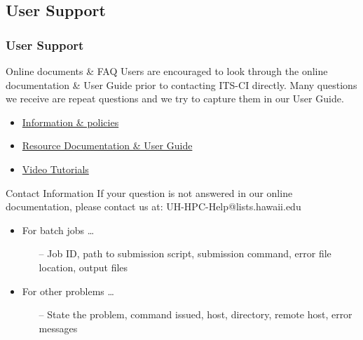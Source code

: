

\subsection{User Support}
\begin{frame}
  \frametitle{User Support}

  \begin{block}{Online documents \& FAQ}
    Users are encouraged to look through the online documentation \& User Guide prior to contacting ITS-CI directly.  Many questions we receive are repeat questions and we try to capture them in our User Guide.~\\
		\begin{itemize}
		\item \href{http://datascience.hawaii.edu/hpc/}{Information \& policies}
		\item \href{http://go.hawaii.edu/ex2}{Resource Documentation \& User Guide}
		\item \href{http://go.hawaii.edu/3A8}{Video Tutorials}
		\end{itemize}
  \end{block}
  \begin{block}{Contact Information}
    If your question is not answered in our online documentation, please contact us at: UH-HPC-Help@lists.hawaii.edu
    
    \begin{itemize}
    \item For batch jobs \ldots
      \begin{itemize}
      \item[--] Job ID, path to submission script, submission command, error file location, output files
      \end{itemize} 
    \item For other problems \ldots
      \begin{itemize}
      \item[--] State the problem, command issued, host, directory, remote host, error messages
      \end{itemize}
    \end{itemize}
  \end{block}
\end{frame}

